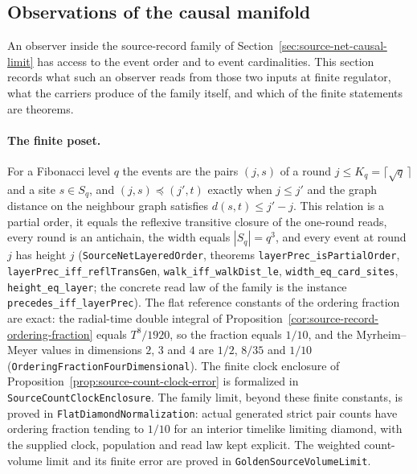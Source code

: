 \subsection{Observations of the causal manifold}
\label{sec:causal-manifold-observations}

An observer inside the source-record family of
Section~\ref{sec:source-net-causal-limit} has access to the event order and
to event cardinalities. This section records what such an observer reads
from those two inputs at finite regulator, what the carriers produce
of the family itself, and which of the finite statements are theorems.

\paragraph{The finite poset.}
For a Fibonacci level $q$ the events are the pairs $(j,s)$ of a round $j\le
K_q=\lceil\sqrt q\,\rceil$ and a site $s\in S_q$, and $(j,s)\preceq(j',t)$
exactly when $j\le j'$ and the graph distance on the neighbour graph
satisfies $d(s,t)\le j'-j$. This relation is a partial order, it equals the
reflexive transitive closure of the one-round reads, every round is an
antichain, the width equals $|S_q|=q^3$, and every event at round $j$ has
height $j$
(\texttt{SourceNetLayeredOrder}, theorems
\texttt{layerPrec\_isPartialOrder}, \texttt{layerPrec\_iff\_reflTransGen},
\texttt{walk\_iff\_walkDist\_le}, \texttt{width\_eq\_card\_sites},
\texttt{height\_eq\_layer}; the concrete read law of the family is the
instance \texttt{precedes\_iff\_layerPrec}). The flat reference constants of
the ordering fraction are exact: the radial-time double integral of
Proposition~\ref{cor:source-record-ordering-fraction} equals $T^8/1920$, so
the fraction equals $1/10$, and the Myrheim--Meyer values in dimensions
$2$, $3$ and $4$ are $1/2$, $8/35$ and $1/10$~\cite{myrheim1978,meyer1988}
(\texttt{OrderingFractionFourDimensional}). The finite
clock enclosure of Proposition~\ref{prop:source-count-clock-error} is
formalized in \texttt{SourceCountClockEnclosure}.
The family limit, beyond these finite constants, is proved in
\texttt{FlatDiamondNormalization}: actual generated strict
pair counts have ordering fraction tending to $1/10$ for an interior
timelike limiting diamond, with the supplied clock, population and read
law kept explicit. The weighted count-volume limit and its finite error
are proved in \texttt{GoldenSourceVolumeLimit}.

